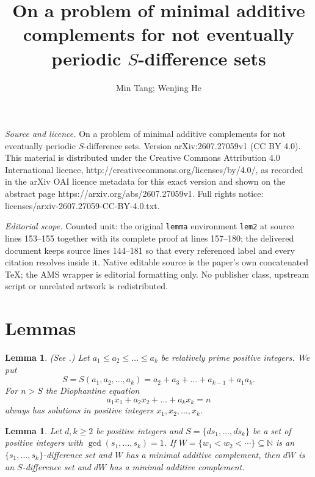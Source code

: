 \documentclass[10pt,a4paper]{amsart}
\numberwithin{equation}{section}
\newtheorem{lemma}[theorem]{Lemma} %
\begin{document}
\title[On a problem of minimal additive complements for not eventua]{On a problem of minimal additive complements for not eventually periodic $S$-difference sets}
\author{Min Tang; Wenjing He}
\date{}
\maketitle
\noindent\emph{Source and licence.} On a problem of minimal additive complements for not eventually periodic $S$-difference sets. Version arXiv:2607.27059v1 (CC BY 4.0). This material is distributed under the Creative Commons Attribution 4.0 International licence, http://creativecommons.org/licenses/by/4.0/, as recorded in the arXiv OAI licence metadata for this exact version and shown on the abstract page https://arxiv.org/abs/2607.27059v1. Full rights notice: licenses/arxiv-2607.27059-CC-BY-4.0.txt.\par\smallskip
\noindent\textit{Editorial scope.} Counted unit: the original \texttt{lemma} environment \texttt{lem2} at source lines 153--155 together with its complete proof at lines 157--180; the delivered document keeps source lines 144--181 so that every referenced label and every citation resolves inside it. Native editable source is the paper's own concatenated TeX; the AMS wrapper is editorial formatting only. No publisher class, upstream script or unrelated artwork is redistributed.
 \section{Lemmas}

 \begin{lemma}\label{lem1} (See \cite[Theorem 1]{Brauer42}.) Let $a_1 \leqslant a_2 \leqslant \dots \leqslant a_k$ be relatively prime positive integers. We put
$$S = S(a_1, a_2, \dots, a_k) = a_2 + a_3 + \dots + a_{k-1} + a_1 a_k.$$
For $n > S$ the Diophantine equation
$$a_1 x_1 + a_2 x_2 + \dots + a_k x_k = n$$
always has solutions in positive integers $x_1, x_2, \dots, x_k$.
\end{lemma}


 \begin{lemma}\label{lem2} Let $d,k\geqslant 2$ be positive integers and $S=\{ds_1,\ldots,ds_k\}$ be a set of positive integers with $\gcd(s_1,\ldots,s_k)=1$.
 If $W = \{ w_1 < w_2 < \cdots \} \subseteq \mathbb{N}$ is an $\{s_1,\ldots,s_k\}$-difference set and $W$ has a minimal additive complement, then $dW$ is an $S$-difference set and $dW$ has a minimal additive complement.
  \end{lemma}
\end{document}
